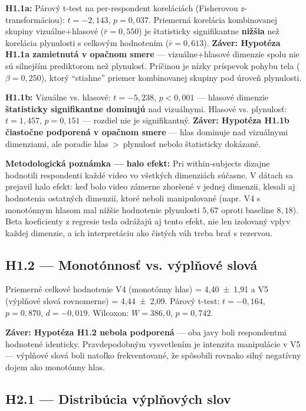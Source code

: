 \textbf{H1.1a:} Párový t-test na per-respondent koreláciách (Fisherovou z-transformáciou): $t = -2{,}143$, $p = 0{,}037$. Priemerná korelácia kombinovanej skupiny vizuálne+hlasové ($\bar r = 0{,}550$) je štatisticky signifikantne \textbf{nižšia} než korelácia plynulosti s celkovým hodnotením ($\bar r = 0{,}613$). \textbf{Záver: Hypotéza H1.1a zamietnutá v opačnom smere} --- vizuálne+hlasové dimenzie spolu nie sú silnejším prediktorom než plynulosť. Príčinou je nízky príspevok pohybu tela ($\beta = 0{,}250$), ktorý ``stiahne'' priemer kombinovanej skupiny pod úroveň plynulosti.

\textbf{H1.1b:} Vizuálne vs. hlasové: $t = -5{,}238$, $p < 0{,}001$ --- hlasové dimenzie \textbf{štatisticky signifikantne dominujú} nad vizuálnymi. Hlasové vs. plynulosť: $t = 1{,}457$, $p = 0{,}151$ --- rozdiel nie je signifikantný. \textbf{Záver: Hypotéza H1.1b čiastočne podporená v opačnom smere} --- hlas dominuje nad vizuálnymi dimenziami, ale poradie hlas~>~plynulosť nebolo štatisticky dokázané.

\textbf{Metodologická poznámka --- halo efekt:} Pri within-subjects dizajne hodnotili respondenti každé video vo všetkých dimenziách súčasne. V dátach sa prejavil halo efekt: keď bolo video zámerne zhoršené v jednej dimenzii, klesali aj hodnotenia ostatných dimenzií, ktoré neboli manipulované (napr. V4 s monotónnym hlasom mal nižšie hodnotenie plynulosti $5{,}67$ oproti baseline $8{,}18$). Beta koeficienty z regresie teda odrážajú aj tento efekt, nie len izolovaný vplyv každej dimenzie, a ich interpretáciu ako čistých váh treba brať s rezervou.

\subsection{H1.2 --- Monotónnosť vs. výplňové slová}

Priemerné celkové hodnotenie V4 (monotónny hlas) = 4,40~±~1,91 a V5 (výplňové slová rovnomerne) = 4,44~±~2,09. Párový t-test: $t = -0{,}164$, $p = 0{,}870$, $d = -0{,}019$. Wilcoxon: $W = 386{,}0$, $p = 0{,}742$.

\textbf{Záver: Hypotéza H1.2 nebola podporená} --- oba javy boli respondentmi hodnotené identicky. Pravdepodobným vysvetlením je intenzita manipulácie v V5 --- výplňové slová boli natoľko frekventované, že spôsobili rovnako silný negatívny dojem ako monotónny hlas.

\subsection{H2.1 --- Distribúcia výplňových slov}

